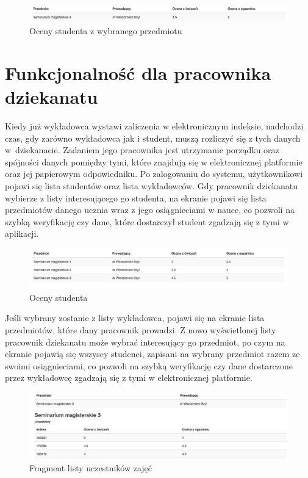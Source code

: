 \documentclass{xmgr}
\begin{document}
\begin{figure}[th!]
\centering
\includegraphics[width=0.7\hsize]{images/studentGrade} 
\caption{Oceny studenta z wybranego przedmiotu\label{RYS.12}}
\end{figure}

\section{Funkcjonalność dla pracownika dziekanatu}

Kiedy już wykładowca wystawi zaliczenia w elektronicznym indeksie, nadchodzi czas, gdy zarówno wykładowca jak i student, muszą rozliczyć się z tych danych w~dziekanacie. Zadaniem jego pracownika jest utrzymanie porządku oraz spójności danych pomiędzy tymi, które znajdują się w elektronicznej platformie oraz jej papierowym odpowiedniku. Po zalogowaniu do systemu, użytkownikowi pojawi się lista studentów oraz lista wykładowców. Gdy pracownik dziekanatu  wybierze z listy interesującego go studenta, na ekranie pojawi się lista przedmiotów danego ucznia wraz z jego osiągnieciami w nauce, co pozwoli na szybką weryfikację czy dane, które dostarczył student zgadzają się z tymi w aplikacji.

\begin{figure}[th!]
\centering
\includegraphics[width=0.7\hsize]{images/studentGrades} 
\caption{Oceny studenta\label{RYS.13}}
\end{figure}
 
Jeśli wybrany zostanie z listy wykładowca, pojawi się na ekranie lista przedmiotów, które dany pracownik prowadzi. Z nowo wyświetlonej listy pracownik dziekanatu może wybrać interesujący go przedmiot, po czym na ekranie pojawią się wszyscy studenci, zapisani na wybrany przedmiot razem ze swoimi osiągnieciami, co pozwoli na szybką weryfikację czy dane dostarczone przez wykładowcę zgadzają się z tymi w elektronicznej platformie.

 \begin{figure}[th!]
\centering
\includegraphics[width=0.61\hsize]{images/deaneryList} 
\caption{Fragment listy uczestników zajęć\label{RYS.14}}
\end{figure}
\end{document}

